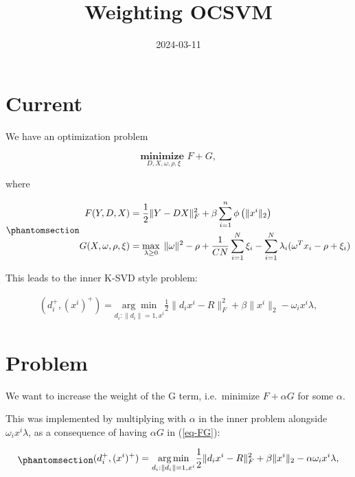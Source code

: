 \documentclass[
  letterpaper,
  DIV=11,
  numbers=noendperiod]{scrartcl}
\title{Weighting OCSVM}
\author{}
\date{2024-03-11}
\renewcommand*\contentsname{Table of contents}
\newcommand\contentsname{Table of contents}
\begin{document}
\maketitle

\renewcommand*\contentsname{Table of contents}
{
\hypersetup{linkcolor=}
\setcounter{tocdepth}{3}
\tableofcontents
}

\section{Current}\label{current}

We have an optimization problem

\[\underset{D, X, \omega, \rho, \xi}{\textbf{minimize  }} F + G,\]

where

\begin{equation}\phantomsection\label{eq-FG}{
\begin{align}
F(Y, D, X)  &= \frac12 \|Y - DX\|_F^2
  + \beta \sum_{i=1}^{n} \phi\left(\|x^i\|_2\right)  \\
G(X, \omega, \rho, \xi) &=\max\limits_{\lambda \ge 0} \; \|\omega\|^2 - \rho + \frac{1}{CN} \sum_{i=1}^{N} \xi_i
- \sum_{i=1}^{N} \lambda_i (\omega^T x_i - \rho + \xi_i)
\end{align}
}\end{equation}

This leads to the inner K-SVD style problem:

\[
\begin{align}
(d^+_i,(x^i)^+) = \underset{d_i: \|d_i\|=1,x^i}{\arg\min} \frac12\|d_ix^i - R\|_F^2  + \beta\|x^i\|_2 - \omega_i x^i\lambda ,
\end{align}
\]

\section{Problem}\label{problem}

We want to increase the weight of the G term, i.e.~minimize
\(F + \alpha G\) for some \(\alpha\).

This was implemented by multiplying with \(\alpha\) in the inner problem
alongside \(\omega_i x^i \lambda\), as a consequence of having
\(\alpha G\) in (\ref{eq-FG}):

\begin{equation}\phantomsection\label{eq-inner}{
\begin{align}
(d^+_i,(x^i)^+) = \underset{d_i: \|d_i\|=1,x^i}{\arg\min} \frac12\|d_ix^i - R\|_F^2  + \beta\|x^i\|_2 - \alpha \omega_i x^i\lambda ,
\end{align}
}\end{equation}
\end{document}
